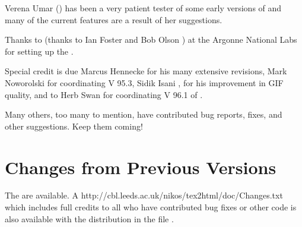 Verena Umar  
() has been a very
patient tester of some early versions of \latextohtml{}
and many of the current features are a result of her 
suggestions. 

Thanks to (thanks to Ian Foster 
 and Bob Olson ) at the
Argonne National Labs for setting up the
.

\begin{changebar}
Special credit is due Marcus Hennecke 
for his many extensive revisions, Mark Noworolski
 for coordinating V 95.3, 
Sidik Isani , for his improvement
in GIF quality, and to Herb Swan  for
coordinating V 96.1 of \latextohtml.
\end{changebar}

Many others, too many to mention, 
have contributed bug reports, fixes, and other suggestions. Keep them coming!


\section{Changes from Previous Versions}
The 
are available. A 
{http://cbl.leeds.ac.uk/nikos/tex2html/doc/Changes.txt}
which includes full credits to all who have contributed 
bug fixes or other code is also available with the
\latextohtml{} distribution in the file .

